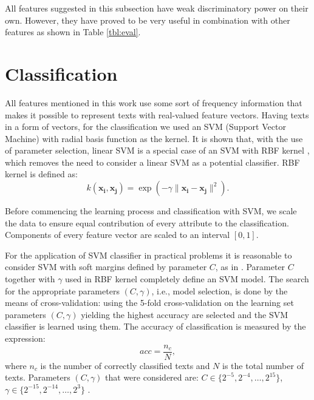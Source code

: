 \documentclass{llncs}
\begin{document}
All features suggested in this subsection have weak discriminatory power
on their own. However, they have proved to be very useful in combination with other features as shown in Table \ref{tbl:eval}.

\section{Classification}
All features mentioned in this work use some sort of frequency information
that makes it possible to represent texts with real-valued feature vectors. Having texts in a form of vectors, for the classification we used an SVM (Support Vector Machine) with radial basis function as the kernel. It is shown that, with the use of parameter selection, linear SVM is a special case of an SVM with RBF kernel \cite{keerthi2003asymptotic}, which removes the need to consider a linear SVM as a potential classifier. RBF kernel is defined as:
\begin{equation}
k(\mathbf{x_i},\mathbf{x_j})=\exp(-\gamma \|\mathbf{x_i} - \mathbf{x_j}\|^2).
\end{equation}

Before commencing the learning process and classification with SVM, we scale
the data to ensure equal contribution of every attribute to the classification. Components of every feature vector are scaled to an interval $[0, 1]$.

For the application of SVM classifier in practical problems it is reasonable to
consider SVM with soft margins defined by parameter $C$, as in
\cite{cortes1995support}. Parameter $C$ together with $\gamma$ used in RBF kernel completely define an SVM model. The search for the appropriate parameters $(C, \gamma)$, i.e., model selection, is done by the means of cross-validation: using
the 5-fold cross-validation on the learning set parameters $(C, \gamma)$ yielding
the highest accuracy are selected and the SVM classifier is learned using them.
The accuracy of classification is measured by the expression:
\begin{equation}
acc = \frac{n_c}{N}, %
\end{equation}
where $n_c$ is the number of correctly classified texts and $N$ is the total number of
texts.
Parameters $(C, \gamma)$ that were considered are: $C \in \{2^{-5}, 2^{-4},
\ldots, 2^{15}\}$, $\gamma \in \{2^{-15}, 2^{-14}, \ldots, 2^3\}$ \cite{CC01a}.
\end{document}

